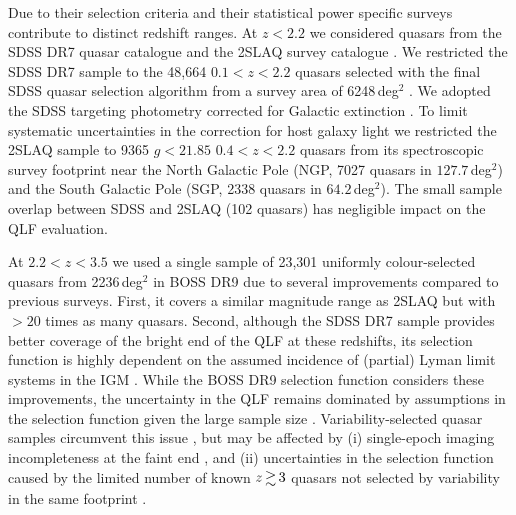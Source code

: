 \documentclass[fleqn,usenatbib]{mnras}
\begin{document}
Due to their selection criteria and their statistical power specific
surveys contribute to distinct redshift ranges. At $z<2.2$ we
considered quasars from the SDSS DR7 quasar catalogue
\citep{2010AJ....139.2360S} and the 2SLAQ survey catalogue
\citep{2009MNRAS.392...19C}. We restricted the SDSS DR7 sample to the
48,664 $0.1<z<2.2$ quasars selected with the final SDSS quasar
selection algorithm \citep{2002AJ....123.2945R, 2006AJ....131.2766R}
from a survey area of 6248\,deg$^2$ \citep{2012ApJ...746..169S}. We
adopted the SDSS targeting photometry corrected for Galactic
extinction \citep{2010AJ....139.2360S}. To limit systematic
uncertainties in the correction for host galaxy light \citep[detailed
  in][]{2009MNRAS.392...19C} we restricted the 2SLAQ sample to 9365
$g<21.85$ $0.4<z<2.2$ quasars from its spectroscopic survey footprint
near the North Galactic Pole (NGP, 7027 quasars in $127.7$\,deg$^2$)
and the South Galactic Pole (SGP, 2338 quasars in
$64.2$\,deg$^2$). The small sample overlap between SDSS and 2SLAQ (102
quasars) has negligible impact on the QLF evaluation.

At $2.2<z<3.5$ we used a single sample of 23,301 uniformly
colour-selected quasars from 2236\,deg$^2$ in BOSS DR9
\citep{2013ApJ...773...14R} due to several improvements compared to
previous surveys. First, it covers a similar magnitude range as 2SLAQ
but with $>20$ times as many quasars. Second, although the SDSS DR7
sample provides better coverage of the bright end of the QLF at these
redshifts, its selection function is highly dependent on the assumed
incidence of (partial) Lyman limit systems in the IGM
\citep{2009ApJ...705L.113P, 2011ApJ...728...23W}. While the BOSS DR9
selection function considers these improvements, the uncertainty in
the QLF remains dominated by assumptions in the selection function
given the large sample size
\citep{2013ApJ...773...14R}. Variability-selected quasar samples
circumvent this issue \citep{2013ApJ...773...14R, 2013A&A...551A..29P,
  2016A&A...587A..41P}, but may be affected by (i) single-epoch
imaging incompleteness at the faint end \citep{2013ApJ...773...14R},
and (ii) uncertainties in the selection function caused by the limited
number of known $z\ga 3$ quasars not selected by variability in the
same footprint \citep{2013A&A...551A..29P, 2016A&A...587A..41P}.
\end{document}
